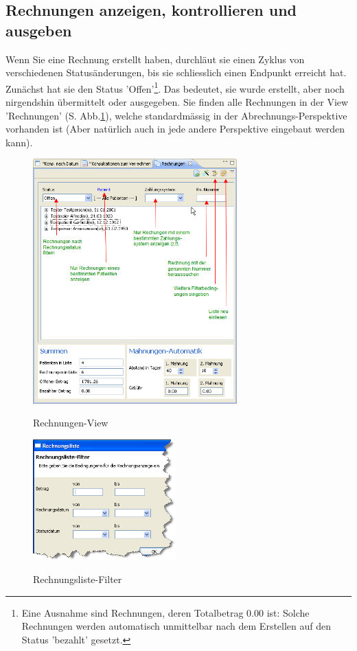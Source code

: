 \documentclass[a4paper]{scrartcl}
\begin{document}
\subsection{Rechnungen anzeigen, kontrollieren und ausgeben}
Wenn Sie eine Rechnung erstellt haben, durchläut sie einen Zyklus von verschiedenen Statusänderungen, bis sie schliesslich einen Endpunkt erreicht hat. Zunächst hat sie den Status 'Offen'\footnote{Eine Ausnahme sind Rechnungen, deren Totalbetrag 0.00 ist: Solche Rechnungen werden automatisch unmittelbar nach dem Erstellen auf den Status 'bezahlt' gesetzt.}. Das bedeutet, sie wurde erstellt, aber noch nirgendshin übermittelt oder ausgegeben. Sie finden alle Rechnungen in der View 'Rechnungen' (S. Abb.\ref{fig:abr11}), welche standardmässig in der Abrechnungs-Perspektive vorhanden ist (Aber natürlich auch in jede andere Perspektive eingebaut werden kann).
\begin{figure}
  \center
  \includegraphics[width=0.7\textwidth]{abr11}\\
  \caption{Rechnungen-View}\label{fig:abr11}
\end{figure}
\begin{figure}
  \center
  \includegraphics[width=5.5cm]{abr12}\\
  \caption{Rechnungsliste-Filter}\label{fig:abr12}
\end{figure}
\end{document}
